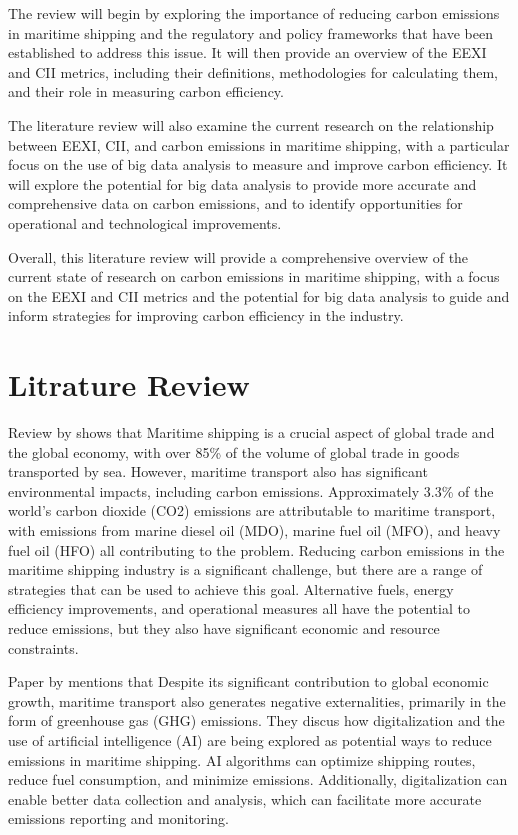 The review will begin by exploring the importance of reducing carbon emissions in maritime shipping and the regulatory and policy frameworks that have been established to address this issue. It will then provide an overview of the EEXI and CII metrics, including their definitions, methodologies for calculating them, and their role in measuring carbon efficiency.

The literature review will also examine the current research on the relationship between EEXI, CII, and carbon emissions in maritime shipping, with a particular focus on the use of big data analysis to measure and improve carbon efficiency. It will explore the potential for big data analysis to provide more accurate and comprehensive data on carbon emissions, and to identify opportunities for operational and technological improvements.

Overall, this literature review will provide a comprehensive overview of the current state of research on carbon emissions in maritime shipping, with a focus on the EEXI and CII metrics and the potential for big data analysis to guide and inform strategies for improving carbon efficiency in the industry.


\section{Litrature Review}


Review by \citeauthor{en15217910} \autocite{en15217910} shows that Maritime shipping is a crucial aspect of global trade and the global economy, with over 85\% of the volume of global trade in goods transported by sea.
However, maritime transport also has significant environmental impacts, including carbon emissions.
Approximately 3.3\% of the world's carbon dioxide (CO2) emissions are attributable to maritime transport, with emissions from marine diesel oil (MDO), marine fuel oil (MFO), and heavy fuel oil (HFO) all contributing to the problem.
Reducing carbon emissions in the maritime shipping industry is a significant challenge, but there are a range of strategies that can be used to achieve this goal.
Alternative fuels, energy efficiency improvements, and operational measures all have the potential to reduce emissions, but they also have significant economic and resource constraints.


Paper by \citeauthor{en15176150} \autocite{en15176150} mentions that  Despite its significant contribution to global economic growth, maritime transport also generates negative externalities, primarily in the form of greenhouse gas (GHG) emissions.
They discus how digitalization and the use of artificial intelligence (AI) are being explored as potential ways to reduce emissions in maritime shipping.
AI algorithms can optimize shipping routes, reduce fuel consumption, and minimize emissions. Additionally, digitalization can enable better data collection and analysis, which can facilitate more accurate emissions reporting and monitoring.

